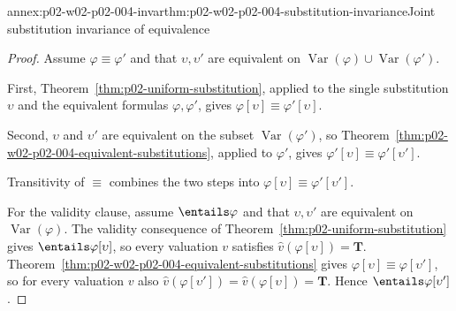 \begin{annexitem}{annex:p02-w02-p02-004-invar}{thm:p02-w02-p02-004-substitution-invariance}{Joint substitution invariance of equivalence}
\begin{proof}
Assume \(\varphi\equiv\varphi'\) and that \(\upsilon,\upsilon'\) are
equivalent on \(\operatorname{Var}(\varphi)\cup\operatorname{Var}(\varphi')\).

First, Theorem~\ref{thm:p02-uniform-substitution}, applied to the single
substitution \(\upsilon\) and the equivalent formulas \(\varphi,\varphi'\),
gives \(\varphi[\upsilon]\equiv\varphi'[\upsilon]\).

Second, \(\upsilon\) and \(\upsilon'\) are equivalent on the subset
\(\operatorname{Var}(\varphi')\), so
Theorem~\ref{thm:p02-w02-p02-004-equivalent-substitutions}, applied to
\(\varphi'\), gives \(\varphi'[\upsilon]\equiv\varphi'[\upsilon']\).

Transitivity of \(\equiv\) combines the two steps into
\(\varphi[\upsilon]\equiv\varphi'[\upsilon']\).

For the validity clause, assume \(\entails\varphi\) and that
\(\upsilon,\upsilon'\) are equivalent on \(\operatorname{Var}(\varphi)\).
The validity consequence of Theorem~\ref{thm:p02-uniform-substitution}
gives \(\entails\varphi[\upsilon]\), so every valuation \(v\) satisfies
\(\widehat v(\varphi[\upsilon])=\mathbf T\).
Theorem~\ref{thm:p02-w02-p02-004-equivalent-substitutions} gives
\(\varphi[\upsilon]\equiv\varphi[\upsilon']\), so for every valuation \(v\)
also \(\widehat v(\varphi[\upsilon'])=\widehat v(\varphi[\upsilon])
=\mathbf T\).  Hence \(\entails\varphi[\upsilon']\).
\end{proof}
\end{annexitem}
